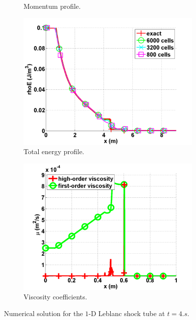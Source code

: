 \documentclass[preprint,10pt]{elsarticle}
\begin{document}
\begin{figure}[H]
\begin{subfigure}[b]{0.495\textwidth}
                \caption{Momentum profile.}
                \label{fig:1d_leblanc_density}
        \end{subfigure}
        \begin{subfigure}[b]{0.495\textwidth}
                \centering
                \includegraphics[width=\textwidth]{Leblanc_exact_and_numerical_stt_total_energy_6000.png}
                \caption{Total energy profile.}
                \label{fig:1d_leblanc_press}
        \end{subfigure}
        \begin{subfigure}[b]{0.495\textwidth}
                \centering
                \includegraphics[width=\textwidth]{Leblanc_viscosity_numerical_6000.png}
                \caption{Viscosity coefficients.}
                \label{fig:1d_leblanc_visc}
        \end{subfigure}
        \caption{Numerical solution for the $1$-D Leblanc shock tube at $t=4.s$.}\label{fig:1d_lebalnc}
\end{figure}
\end{document}
